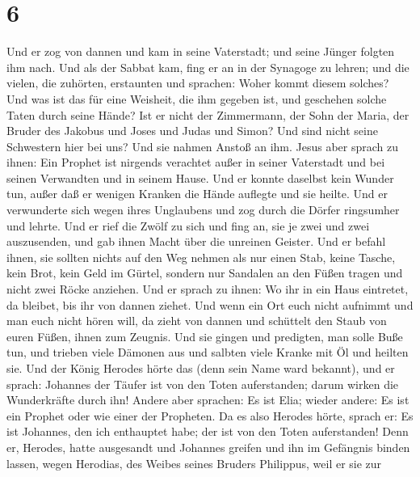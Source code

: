 \hypertarget{section-5}{%
\section{6}\label{section-5}}

 Und er zog von dannen und kam in seine Vaterstadt; und
seine Jünger folgten ihm nach.  Und als der Sabbat kam,
fing er an in der Synagoge zu lehren; und die vielen, die zuhörten,
erstaunten und sprachen: Woher kommt diesem solches? Und was ist das für
eine Weisheit, die ihm gegeben ist, und geschehen solche Taten durch
seine Hände?  Ist er nicht der Zimmermann, der Sohn der
Maria, der Bruder des Jakobus und Joses und Judas und Simon? Und sind
nicht seine Schwestern hier bei uns? Und sie nahmen Anstoß an ihm.
 Jesus aber sprach zu ihnen: Ein Prophet ist nirgends
verachtet außer in seiner Vaterstadt und bei seinen Verwandten und in
seinem Hause.  Und er konnte daselbst kein Wunder tun,
außer daß er wenigen Kranken die Hände auflegte und sie heilte.
 Und er verwunderte sich wegen ihres Unglaubens und zog
durch die Dörfer ringsumher und lehrte.  Und er rief die
Zwölf zu sich und fing an, sie je zwei und zwei auszusenden, und gab
ihnen Macht über die unreinen Geister.  Und er befahl
ihnen, sie sollten nichts auf den Weg nehmen als nur einen Stab, keine
Tasche, kein Brot, kein Geld im Gürtel,  sondern nur
Sandalen an den Füßen tragen und nicht zwei Röcke anziehen.
 Und er sprach zu ihnen: Wo ihr in ein Haus eintretet, da
bleibet, bis ihr von dannen ziehet.  Und wenn ein Ort
euch nicht aufnimmt und man euch nicht hören will, da zieht von dannen
und schüttelt den Staub von euren Füßen, ihnen zum Zeugnis.
 Und sie gingen und predigten, man solle Buße tun,
 und trieben viele Dämonen aus und salbten viele Kranke
mit Öl und heilten sie.  Und der König Herodes hörte das
(denn sein Name ward bekannt), und er sprach: Johannes der Täufer ist
von den Toten auferstanden; darum wirken die Wunderkräfte durch ihn!
 Andere aber sprachen: Es ist Elia; wieder andere: Es ist
ein Prophet oder wie einer der Propheten.  Da es also
Herodes hörte, sprach er: Es ist Johannes, den ich enthauptet habe; der
ist von den Toten auferstanden!  Denn er, Herodes, hatte
ausgesandt und Johannes greifen und ihn im Gefängnis binden lassen,
wegen Herodias, des Weibes seines Bruders Philippus, weil er sie zur
